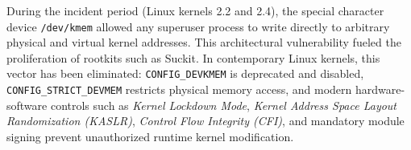\begin{perspectiva20}
During the incident period (Linux kernels 2.2 and 2.4), the special character device \texttt{/dev/kmem} allowed any superuser process to write directly to arbitrary physical and virtual kernel addresses. This architectural vulnerability fueled the proliferation of rootkits such as Suckit. In contemporary Linux kernels, this vector has been eliminated: \texttt{CONFIG\_DEVKMEM} is deprecated and disabled, \texttt{CONFIG\_STRICT\_DEVMEM} restricts physical memory access, and modern hardware-software controls such as \textit{Kernel Lockdown Mode}, \textit{Kernel Address Space Layout Randomization (KASLR)}, \textit{Control Flow Integrity (CFI)}, and mandatory module signing prevent unauthorized runtime kernel modification.
\end{perspectiva20}
